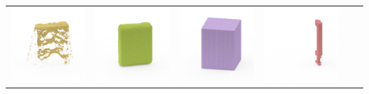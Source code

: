 \documentclass[10pt,onecolumn,letterpaper]{article}
\begin{document}
\begin{tabular}{cccccc}
\includegraphics[height=\turnheight, clip=true, trim=60 30 30 5]{sunkist_fruit_snacks_mixed_fruit_NP4_0_visible_pixels_view_90.png} &
\includegraphics[height=\turnheight, clip=true, trim=60 30 30 5]{sunkist_fruit_snacks_mixed_fruit_NP4_0_gt_view_90.png} &
\includegraphics[height=\turnheight, clip=true, trim=60 30 30 5]{sunkist_fruit_snacks_mixed_fruit_NP4_0_bb_view_90.png} &
\includegraphics[height=\turnheight, clip=true, trim=60 30 30 5]{sunkist_fruit_snacks_mixed_fruit_NP4_0_zheng_view_90.png} &

\end{tabular}
\end{document}
